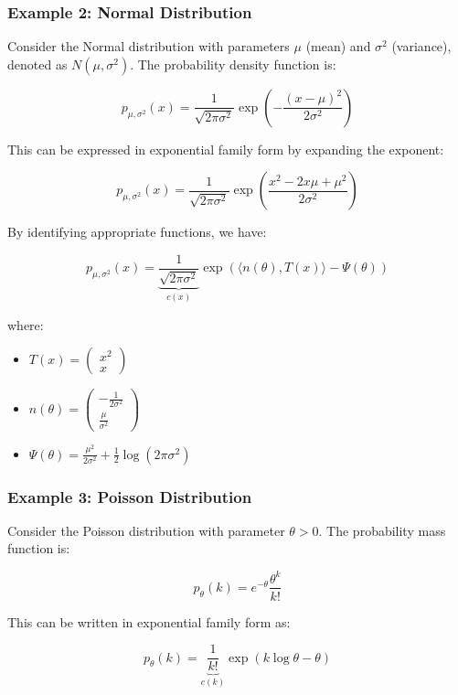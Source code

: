 \documentclass[open=any, 11pt,paper=A4]{scrreprt}
\begin{document}
\subsubsection*{Example 2: Normal Distribution}

Consider the Normal distribution with parameters \(\mu\) (mean) and \(\sigma^2\) (variance), denoted as \(N(\mu, \sigma^2)\). The probability density function is:

\[
p_{\mu, \sigma^2}(x) = \frac{1}{\sqrt{2\pi \sigma^2}} \exp\left( -\frac{(x - \mu)^2}{2\sigma^2} \right)
\]

This can be expressed in exponential family form by expanding the exponent:

\[
p_{\mu, \sigma^2}(x) = \frac{1}{\sqrt{2\pi \sigma^2}} \exp\left( \frac{x^2 - 2x\mu + \mu^2}{2\sigma^2} \right)
\]

By identifying appropriate functions, we have:

\[
p_{\mu, \sigma^2}(x) = \underbrace{\frac{1}{\sqrt{2\pi \sigma^2}}}_{c(x)} \exp\left( \langle n(\theta), T(x) \rangle - \Psi(\theta) \right)
\]

where:
\begin{itemize}
    \item \(T(x) = \begin{pmatrix} x^2 \\ x \end{pmatrix}\)
    \item \(n(\theta) = \begin{pmatrix} -\frac{1}{2\sigma^2} \\ \frac{\mu}{\sigma^2} \end{pmatrix}\)
    \item \(\Psi(\theta) = \frac{\mu^2}{2\sigma^2} + \frac{1}{2} \log(2\pi \sigma^2)\)
\end{itemize}

\subsubsection*{Example 3: Poisson Distribution}

Consider the Poisson distribution with parameter \(\theta > 0\). The probability mass function is:

\[
p_\theta(k) = e^{-\theta} \frac{\theta^k}{k!}
\]

This can be written in exponential family form as:

\[
p_\theta(k) = \underbrace{\frac{1}{k!}}_{c(k)} \exp\left( k \log \theta - \theta \right)
\]
\end{document}
